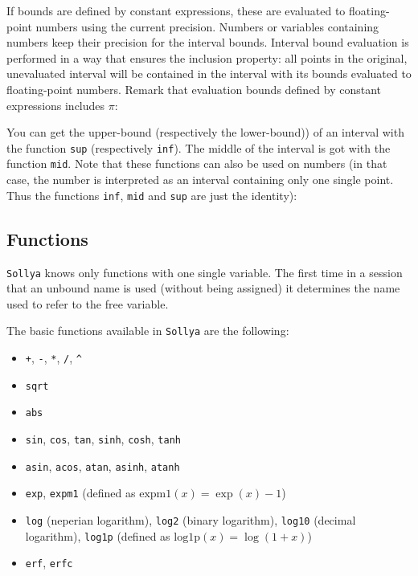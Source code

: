 \documentclass[a4paper]{article}
\newcommand{\com}[1]{\texttt{#1}}
\newcommand{\sollya}{\texttt{Sollya}\xspace}
\begin{document}


If bounds are defined by constant expressions, these are evaluated to floating-point numbers using the current precision. Numbers or variables containing numbers keep their precision for the interval bounds. Interval bound evaluation is performed in a way that ensures the inclusion property: all points
in the original, unevaluated interval will be contained in the interval with its bounds evaluated to floating-point numbers. Remark that 
evaluation bounds defined by constant expressions includes $\pi$:



You can get the upper-bound (respectively the lower-bound)) of an interval with the function \com{sup} (respectively \com{inf}). The middle of the interval is got with the function \com{mid}. Note that these functions can also be used on numbers (in that case, the number is interpreted as an interval containing only one single point. Thus the functions \com{inf}, \com{mid} and \com{sup} are just the identity):



\subsection{Functions}
\sollya knows only functions with one single variable. The first time in a session that an unbound name is used (without being assigned) it determines the name used to refer to the free variable.

The basic functions available in \sollya are the following:
\begin{itemize}
\item \com{+}, \com{-}, \com{*}, \com{/}, \com{\^{}}
\item \com{sqrt}
\item \com{abs}
\item \com{sin}, \com{cos}, \com{tan}, \com{sinh}, \com{cosh}, \com{tanh}
\item \com{asin}, \com{acos}, \com{atan}, \com{asinh}, \com{atanh}
\item \com{exp}, \com{expm1} (defined as $\mathrm{expm1}(x) = \exp(x)-1$)
\item \com{log} (neperian logarithm), \com{log2} (binary logarithm), \com{log10} (decimal logarithm), \com{log1p} (defined as $\mathrm{log1p}(x) = \log(1+x)$)
\item \com{erf}, \com{erfc}
\end{itemize}
\end{document}
